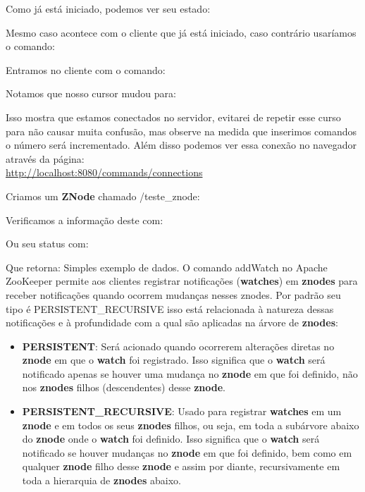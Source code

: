 \documentclass[a4paper,11pt]{article}
\begin{document}
Como já está iniciado, podemos ver seu estado: \\

Mesmo caso acontece com o cliente que já está iniciado, caso contrário usaríamos o comando: \\

Entramos no cliente com o comando: \\

Notamos que nosso cursor mudou para: \\

Isso mostra que estamos conectados no servidor, evitarei de repetir esse curso para não causar muita confusão, mas observe na medida que inserimos comandos o número será incrementado. Além disso podemos ver essa conexão no navegador através da página: \\
\url{http://localhost:8080/commands/connections}

Criamos um \textbf{ZNode} chamado /teste\_znode: \\

Verificamos a informação deste com: \\

Ou seu status com: \\

Que retorna: Simples exemplo de dados. O comando addWatch no Apache ZooKeeper permite aos clientes registrar notificações (\textbf{watches}) em \textbf{znodes} para receber notificações quando ocorrem mudanças nesses znodes. Por padrão seu tipo é PERSISTENT\_RECURSIVE isso está relacionada à natureza dessas notificações e à profundidade com a qual são aplicadas na árvore de \textbf{znodes}: \vspace{-1em}
\begin{itemize}
	\item \textbf{PERSISTENT}: Será acionado quando ocorrerem alterações diretas no \textbf{znode} em que o \textbf{watch} foi registrado. Isso significa que o \textbf{watch} será notificado apenas se houver uma mudança no \textbf{znode} em que foi definido, não nos \textbf{znodes} filhos (descendentes) desse \textbf{znode}.
	\item \textbf{PERSISTENT\_RECURSIVE}: Usado para registrar \textbf{watches} em um \textbf{znode} e em todos os seus \textbf{znodes} filhos, ou seja, em toda a subárvore abaixo do \textbf{znode} onde o \textbf{watch} foi definido. Isso significa que o \textbf{watch} será notificado se houver mudanças no \textbf{znode} em que foi definido, bem como em qualquer \textbf{znode} filho desse \textbf{znode} e assim por diante, recursivamente em toda a hierarquia de \textbf{znodes} abaixo.
\end{itemize}
\end{document}
